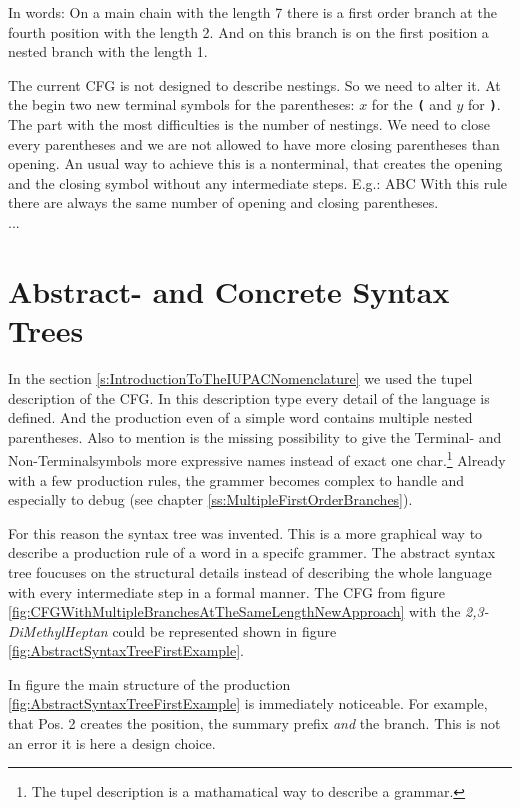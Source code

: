 \documentclass[a4paper,10pt]{article}
\newcommand{\gerquot}[1]{\glqq#1\grqq}
\newcommand{\dashAndSpace}{\textendash \space}
\begin{document}
In words: On a main chain with the length 7 \dashAndSpace there is a first order branch at the fourth position with the length 2. And on this branch is on the first position a nested branch with the length 1.

The current CFG is not designed to describe nestings. So we need to alter it. At the begin two new terminal symbols for the parentheses: $x$ for the \texttt{\textbf{(}} and $y$ for \texttt{\textbf{)}}. The part with the most difficulties is the number of nestings. We need to close every parentheses and we are not allowed to have more closing parentheses than opening. An usual way to achieve this is a nonterminal, that creates the opening and the closing symbol \dashAndSpace without any intermediate steps. E.g.: A{\color{red}{x}}B{\color{red}{y}}C With this rule there are always the same number of opening and closing parentheses.\\


\noindent...



\section{Abstract- and Concrete Syntax Trees}\label{s:AbstractAndConcreteSyntaxTrees}
In the section \ref{s:IntroductionToTheIUPACNomenclature} we used the tupel description of the CFG. In this description type every detail of the language is defined. And the production even of a simple word contains multiple nested parentheses. Also to mention is the missing possibility to give the Terminal- and Non-Terminalsymbols more expressive names instead of exact one char.\footnote{The tupel description is a mathamatical way to describe a grammar.} Already with a few production rules, the grammer becomes complex to handle and especially to debug (see chapter \ref{ss:MultipleFirstOrderBranches}).

For this reason the syntax tree was invented. This is a more graphical way to describe a production rule of a word in a specifc grammer. The abstract syntax tree foucuses on the structural details instead of describing the whole language with every intermediate step in a formal manner. The CFG from figure \ref{fig:CFGWithMultipleBranchesAtTheSameLengthNewApproach} with the \emph{2,3-DiMethylHeptan} could be represented shown in figure \ref{fig:AbstractSyntaxTreeFirstExample}.

In figure the main structure of the production \ref{fig:AbstractSyntaxTreeFirstExample} is immediately noticeable. For example, that \gerquot{Pos. 2} creates the position, the summary prefix \emph{and} the branch. This is not an error \dashAndSpace it is here a design choice.
\end{document}
